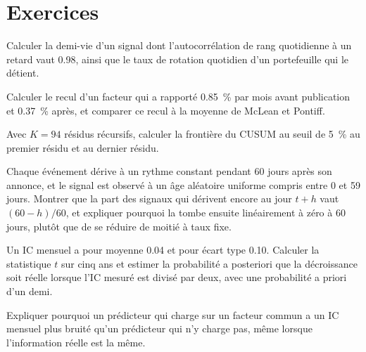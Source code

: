 \section{Exercices}

\begin{exercise}[$\star$]\label{exo:rs:half-life-decay-and-stability:1}
Calculer la demi-vie d'un signal dont l'autocorrélation de rang quotidienne à un retard vaut 0.98, ainsi que le taux de rotation quotidien d'un portefeuille qui le détient.
\end{exercise}

\begin{exercise}[$\star$]\label{exo:rs:half-life-decay-and-stability:2}
Calculer le recul d'un facteur qui a rapporté 0.85~\% par mois avant publication et 0.37~\% après, et comparer ce recul
à la moyenne de McLean et Pontiff.
\end{exercise}

\begin{exercise}[$\star$]\label{exo:rs:half-life-decay-and-stability:3}
Avec $K = 94$ résidus récursifs, calculer la frontière du CUSUM au seuil de 5~\% au premier résidu et au dernier résidu.
\end{exercise}

\begin{exercise}[$\star\star$]\label{exo:rs:half-life-decay-and-stability:4}
Chaque événement dérive à un rythme constant pendant 60 jours après son annonce, et le signal est observé à un âge
aléatoire uniforme compris entre 0 et 59 jours. Montrer que la part des signaux qui dérivent encore au jour $t + h$ vaut $(60 - h)/60$, et expliquer pourquoi la 
tombe ensuite linéairement à zéro à 60 jours, plutôt que de se réduire de moitié à taux fixe.
\end{exercise}

\begin{exercise}[$\star\star$]\label{exo:rs:half-life-decay-and-stability:5}
Un IC mensuel a pour moyenne 0.04 et pour écart type 0.10. Calculer la statistique $t$ sur cinq ans et estimer
la probabilité a posteriori que la décroissance soit réelle lorsque l'IC mesuré est divisé par deux, avec une probabilité a priori d'un demi.
\end{exercise}

\begin{exercise}[$\star\star$]\label{exo:rs:half-life-decay-and-stability:6}
Expliquer pourquoi un prédicteur qui charge sur un facteur commun a un IC mensuel plus bruité qu'un prédicteur qui n'y charge pas, même lorsque l'information réelle est la même.
\end{exercise}

